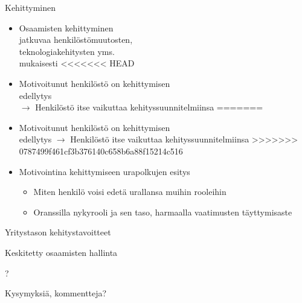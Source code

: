 \documentclass[first=purple,second=dblue,logo=redquo]{aaltoslides}
\begin{document}
\begin{frame}{Kehittyminen}
\begin{itemize}
\item Osaamisten kehittyminen \\ jatkuvaa henkilöstömuutosten, \\ teknologiakehitysten yms. \\ mukaisesti
<<<<<<< HEAD
\item Motivoitunut henkilöstö on kehittymisen \\ edellytys \\ $\rightarrow$ Henkilöstö itse vaikuttaa kehityssuunnitelmiinsa
=======
\item Motivoitunut henkilöstö on kehittymisen \\ edellytys $\rightarrow$ Henkilöstö itse vaikuttaa kehityssuunnitelmiinsa
>>>>>>> 0787499f461cf3b376140c658b6a88f15214c516
\item Motivointina kehittymiseen urapolkujen esitys
\begin{itemize}
\item Miten henkilö voisi edetä urallansa muihin rooleihin
\item Oranssilla nykyrooli ja sen taso, harmaalla vaatimusten täyttymisaste
\end{itemize}
\end{itemize}
\end{frame}
\begin{frame}{Yritystason kehitystavoitteet}

\end{frame}
\begin{frame}{Keskitetty osaamisten hallinta}

\end{frame}
{
\begin{frame}{?}
\begin{center}
Kysymyksiä, kommentteja?
\end{center}
\end{frame}
}
\end{document}
